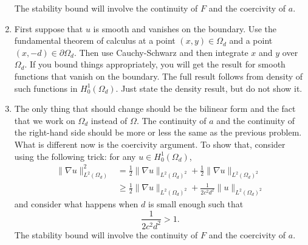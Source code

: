 \documentclass{article}
\theoremstyle{plain}
\theoremstyle{definition}
\theoremstyle{remark}
\begin{document}
\begin{enumerate}
	      The stability bound will involve the continuity of $F$ and the coercivity of $a$.
	\item First suppose that $u$ is smooth and vanishes on the boundary.
	      Use the fundamental theorem of calculus at a point $(x,y) \in \Omega_d$ and a point $(x,-d) \in \partial \Omega_d$.
	      Then use Cauchy-Schwarz and then integrate $x$ and $y$ over $\Omega_d$.
	      If you bound things appropriately, you will get the result for smooth functions that vanish on the boundary.
	      The full result follows from density of such functions in $H^1_0(\Omega_d)$.
	      Just state the density result, but do not show it.
	\item The only thing that should change should be the bilinear form and the fact that we work on $\Omega_d$ instead of $\Omega$.
	      The continuity of $a$ and the continuity of the right-hand side should be more or less the same as the previous problem.
	      What is different now is the coercivity argument.
	      To show that, consider using the following trick: for any $u \in H_0^1(\Omega_d)$,
	      \begin{align*}
		      \|\nabla u\|_{L^2(\Omega_d)}^2 & = \frac{1}{2}\|\nabla u\|_{L^2(\Omega_d)^2} + \frac{1}{2}\|\nabla u\|_{L^2(\Omega_d)^2}   \\
		                                     & \geq \frac{1}{2}\|\nabla u\|_{L^2(\Omega_d)^2} + \frac{1}{2c^2d^2}\|u\|_{L^2(\Omega_d)^2}
	      \end{align*}
	      and consider what happens when $d$ is small enough such that \[\frac{1}{2c^2d^2} > 1.\]
	      The stability bound will involve the continuity of $F$ and the coercivity of $a$.
\end{enumerate}
\end{document}
